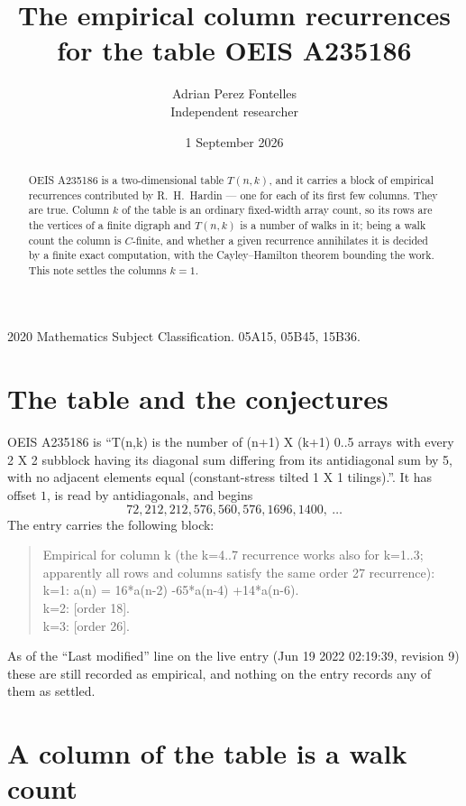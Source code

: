 \documentclass[11pt,a4paper]{article}
\title{The empirical column recurrences for the table OEIS A235186}
\author{Adrian Perez Fontelles\\ \small Independent researcher}
\date{1 September 2026}
\theoremstyle{plain}
\theoremstyle{definition}
\begin{document}
\maketitle

\begin{abstract}
OEIS A235186 is a two-dimensional table $T(n,k)$, and it carries a block of empirical
recurrences contributed by R.~H.~Hardin --- one for each of its first few columns. They are
true. Column $k$ of the table is an ordinary fixed-width array count, so its rows are the
vertices of a finite digraph and $T(n,k)$ is a number of walks in it; being a walk count the
column is $C$-finite, and whether a given recurrence annihilates it is decided by a finite
exact computation, with the Cayley--Hamilton theorem bounding the work. This note settles the
columns $k=1$.
\end{abstract}

\noindent\small 2020 Mathematics Subject Classification. 05A15, 05B45, 15B36.\normalsize

\section{The table and the conjectures}

OEIS A235186 is ``T(n,k) is the number of (n+1) X (k+1) 0..5 arrays with every 2 X 2 subblock having its diagonal sum differing from its antidiagonal sum by 5, with no adjacent elements equal (constant-stress tilted 1 X 1 tilings).''. It has offset $1$, is
read by antidiagonals, and begins
\[
72, 212, 212, 576, 560, 576, 1696, 1400,\ \dots
\]
The entry carries the following block:
\begin{quote}\small
Empirical for column k (the k=4..7 recurrence works also for k=1..3; apparently all rows and columns satisfy the same order 27 recurrence):\\
k=1: a(n) = 16*a(n-2) -65*a(n-4) +14*a(n-6).\\
k=2: [order 18].\\
k=3: [order 26].\\
\end{quote}
As of the ``Last modified'' line on the live entry (Jun 19 2022 02:19:39, revision 9) these are still
recorded as empirical, and nothing on the entry records any of them as settled.

\section{A column of the table is a walk count}
\end{document}
